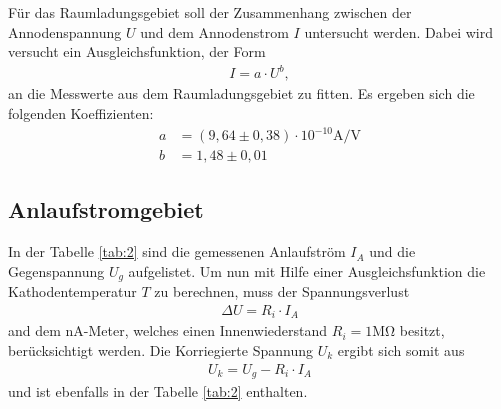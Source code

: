 Für das Raumladungsgebiet soll der Zusammenhang
zwischen der Annodenspannung $U$ und dem Annodenstrom $I$ untersucht
werden.
Dabei wird versucht ein Ausgleichsfunktion, der Form
\begin{align}
  I=a\cdot U^{b},
\end{align}
an die Messwerte aus dem Raumladungsgebiet zu fitten.
Es ergeben sich die folgenden Koeffizienten:
\begin{align*}
a&=(9,64\pm0,38)\cdot10^{-10}\si{\ampere\per\volt}\\
b&=1,48\pm0,01
\end{align*}




\subsection{Anlaufstromgebiet}
In der Tabelle \ref{tab:2} sind die gemessenen Anlaufström $I_A$
und die Gegenspannung $U_g$ aufgelistet.
Um nun mit Hilfe einer Ausgleichsfunktion die Kathodentemperatur $T$
zu berechnen, muss der Spannungsverlust
\begin{align*}
  \Delta U=R_i\cdot I_A
\end{align*}
and dem nA-Meter, welches einen Innenwiederstand $R_i=1\si{\mega\ohm}$ besitzt,
berücksichtigt werden.
Die Korriegierte Spannung $U_k$ ergibt sich somit aus
\begin{align}
U_k=U_g-R_i\cdot I_A \label{eqn:U_k}
\end{align}
und ist ebenfalls in der Tabelle \ref{tab:2} enthalten.

